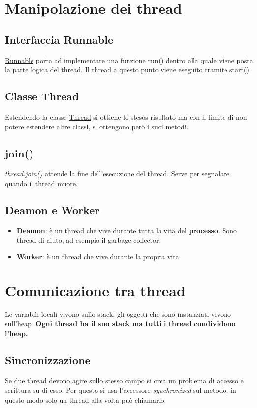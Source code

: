 \documentclass[11pt,a4paper]{book}
\begin{document}
\chapter{Manipolazione dei thread}
\section{Interfaccia Runnable}
\href{https://docs.oracle.com/javase/7/docs/api/java/lang/Runnable.html}{Runnable} porta ad implementare una funzione run() dentro alla quale viene posta la parte logica del thread. Il thread a questo punto viene eseguito tramite start()

\section{Classe Thread}
Estendendo la classe \href{https://docs.oracle.com/javase/7/docs/api/java/lang/Thread.html}{Thread} si ottiene lo stesos risultato ma con il limite di non potere estendere altre classi, si ottengono però i suoi metodi.

\section{join()}
\emph{thread.join()} attende la fine dell'esecuzione del thread. Serve per segnalare quando il thread muore.

\section{Deamon e Worker}
\begin{itemize}
	\item \textbf{Deamon}: è un thread che vive durante tutta la vita del \textbf{processo}. Sono thread di aiuto, ad esempio il garbage collector. 
	\item \textbf{Worker}: è un thread che vive durante la propria vita
\end{itemize}

\chapter{Comunicazione tra thread}
Le variabili locali vivono sullo stack, gli oggetti che sono instanziati vivono sull'heap. \textbf{Ogni thread ha il suo stack ma tutti i thread condividono l'heap.} 

\section{Sincronizzazione}
Se due thread devono agire sullo stesso campo si crea un problema di accesso e scrittura su di esso. Per questo si usa l'accessore \emph{synchronized} sul metodo, in questo modo solo un thread alla volta può chiamarlo.
\end{document}
